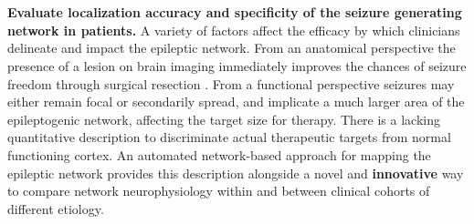 ~\\
~\\
 \textbf{Evaluate localization accuracy and specificity of the seizure generating network in patients.}
A variety of factors affect the efficacy by which clinicians delineate and impact the epileptic network. From an anatomical perspective the presence of a lesion on brain imaging immediately improves the chances of seizure freedom through surgical resection \cite{french2007refractory}. From a functional perspective seizures may either remain focal or secondarily spread, and implicate a much larger area of the epileptogenic network, affecting the target size for therapy. There is a lacking quantitative description to discriminate actual therapeutic targets from normal functioning cortex. An automated network-based approach for mapping the epileptic network provides this description alongside a novel and \textbf{innovative} way to compare network neurophysiology within and between clinical cohorts of different etiology.

